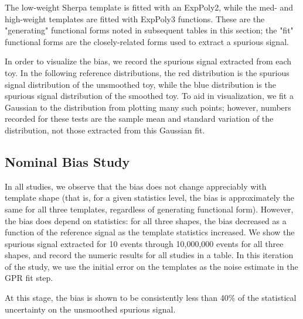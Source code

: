 The low-weight Sherpa template is fitted with an ExpPoly2, while the med- and high-weight templates are fitted with ExpPoly3 functions. These are the "generating" functional forms noted in subsequent tables in this section; the "fit" functional forms are the closely-related forms used to extract a spurious signal.

In order to visualize the bias, we record the spurious signal extracted from each toy. In the following reference distributions, the red distribution is the spurious signal distribution of the unsmoothed toy, while the blue distribution is the spurious signal distribution of the smoothed toy. To aid in visualization, we fit a Gaussian to the distribution from plotting many such points; however, numbers recorded for these tests are the sample mean and standard variation of the distribution, not those extracted from this Gaussian fit.

\subsection{Nominal Bias Study}

In all studies, we observe that the bias does not change appreciably with template shape (that is, for a given statistics level, the bias is approximately the same for all three templates, regardless of generating functional form). However, the bias does depend on statistics: for all three shapes, the bias decreased as a function of the reference signal as the template statistics increased. We show the spurious signal extracted for 10 events through 10,000,000 events for all three shapes, and record the numeric results for all studies in a table. In this iteration of the study, we use the initial error on the templates as the noise estimate in the GPR fit step. 

At this stage, the bias is shown to be consistently less than 40\% of the statistical uncertainty on the unsmoothed spurious signal.

